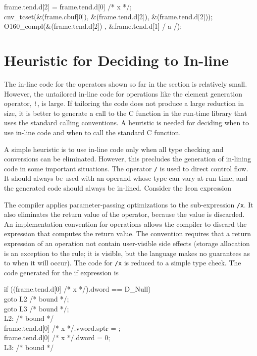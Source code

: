 \goodbreak
\begin{iconcode}
\>frame.tend.d[2] = frame.tend.d[0] /* x */;\\
\>cnv\_tcset(\&(frame.cbuf[0]), \&(frame.tend.d[2]), \&(frame.tend.d[2]));\\
\>O160\_compl(\&(frame.tend.d[2]) , \&frame.tend.d[1] / a /);\\
\end{iconcode}


\section{Heuristic for Deciding to In-line}

The in-line code for the operators shown so far in the section is
relatively small. However, the untailored in-line code for operations
like the element generation operator, \texttt{!}, is large. If tailoring the
code does not produce a large reduction in size, it is better to
generate a call to the C function in the run-time library that uses
the standard calling conventions. A heuristic is needed for deciding
when to use in-line code and when to call the standard C function.


A simple heuristic is to use in-line code only when all type checking
and conversions can be eliminated. However, this precludes the
generation of in-lining code in some important situations. The
operator \texttt{/} is used to direct control flow.  It should always be used
with an operand whose type can vary at run time, and the generated
code should always be in-lined. Consider the Icon expression


\noindent
The compiler applies parameter-passing optimizations to the
sub-expression \texttt{/x}. It also eliminates the return value of the
operator, because the value is discarded. An implementation convention
for operations allows the compiler to discard the expression that
computes the return value. The convention requires that a return
expression of an operation not contain user-visible side effects
(storage allocation is an exception to the rule; it is visible, but
the language makes no guarantees as to when it will occur). The code
for \texttt{/x} is reduced to a simple type check. The code generated for the
if expression is

\goodbreak
\begin{iconcode}
\>\>if ((frame.tend.d[0] /* x */).dword == D\_Null)\\
\>\>\>goto L2 /* bound */;\\
\>\>goto L3 /* bound */;\\
\>L2: /* bound */\\
\>\>frame.tend.d[0] /* x */.vword.sptr = ;\\
\>\>frame.tend.d[0] /* x */.dword = 0;\\
\>L3: /* bound */\\
\end{iconcode}


